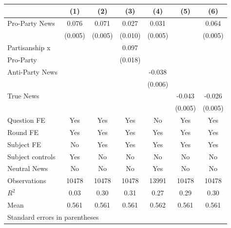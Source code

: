 \begin{tabular}{l*{6}{c}}
\hline\hline
                    &\multicolumn{1}{c}{(1)}&\multicolumn{1}{c}{(2)}&\multicolumn{1}{c}{(3)}&\multicolumn{1}{c}{(4)}&\multicolumn{1}{c}{(5)}&\multicolumn{1}{c}{(6)}\\
\hline
Pro-Party News      &    0.076&    0.071&    0.027&    0.031&         &    0.064\\
                    &  (0.005)&  (0.005)&  (0.010)&  (0.005)&         &  (0.005)\\
Partisanship x      &         &         &    0.097&         &         &         \\
Pro-Party           &         &         &  (0.018)&         &         &         \\
Anti-Party News     &         &         &         &   -0.038&         &         \\
                    &         &         &         &  (0.006)&         &         \\
True News           &         &         &         &         &   -0.043&   -0.026\\
                    &         &         &         &         &  (0.005)&  (0.005)\\
Question FE         &      Yes&      Yes&      Yes&       No&      Yes&      Yes\\
Round FE            &      Yes&      Yes&      Yes&      Yes&      Yes&      Yes\\
Subject FE          &       No&      Yes&      Yes&      Yes&      Yes&      Yes\\
Subject controls    &      Yes&       No&       No&       No&       No&       No\\
Neutral News        &       No&       No&       No&      Yes&       No&       No\\
\hline
Observations        &    10478&    10478&    10478&    13991&    10478&    10478\\
\(R^{2}\)           &     0.03&     0.30&     0.31&     0.27&     0.29&     0.30\\
Mean                &    0.561&    0.561&    0.561&    0.562&    0.561&    0.561\\
\hline\hline
\multicolumn{7}{l}{\footnotesize Standard errors in parentheses}\\
\end{tabular}
